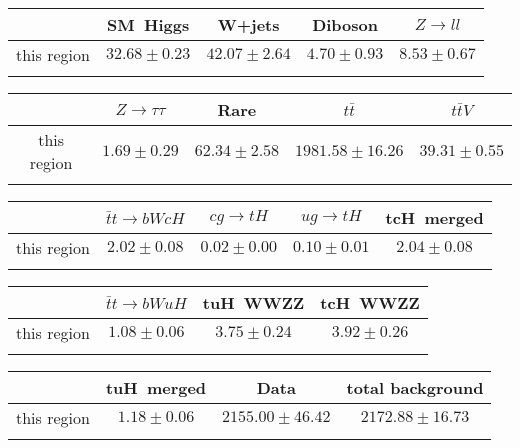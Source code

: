 \centering
\begin{tabular}{ccccc} \toprule\toprule
 & SM~Higgs & W+jets & Diboson & $Z\to ll$\\\midrule
this region & $32.68\pm0.23$ & $42.07\pm2.64$ & $4.70\pm0.93$ & $8.53\pm0.67$\\
\bottomrule\bottomrule\\
\end{tabular}
\begin{tabular}{ccccc} \toprule\toprule
 & $Z\to \tau\tau$ & Rare & $t\bar{t}$ & $t\bar{t}V$\\\midrule
this region & $1.69\pm0.29$ & $62.34\pm2.58$ & $1981.58\pm16.26$ & $39.31\pm0.55$\\
\bottomrule\bottomrule\\
\end{tabular}
\begin{tabular}{ccccc} \toprule\toprule
 & $\bar{t}t\to bWcH$ & $cg\to tH$ & $ug\to tH$ & tcH~merged\\\midrule
this region & $2.02\pm0.08$ & $0.02\pm0.00$ & $0.10\pm0.01$ & $2.04\pm0.08$\\
\bottomrule\bottomrule\\
\end{tabular}
\begin{tabular}{cccc} \toprule\toprule
 & $\bar{t}t\to bWuH$ & tuH~WWZZ & tcH~WWZZ\\\midrule
this region & $1.08\pm0.06$ & $3.75\pm0.24$ & $3.92\pm0.26$\\
\bottomrule\bottomrule\\
\end{tabular}
\begin{tabular}{cccc} \toprule\toprule
 & tuH~merged & Data & total background\\\midrule
this region & $1.18\pm0.06$ & $2155.00\pm46.42$ & $2172.88\pm16.73$\\
\bottomrule\bottomrule\\
\end{tabular}
